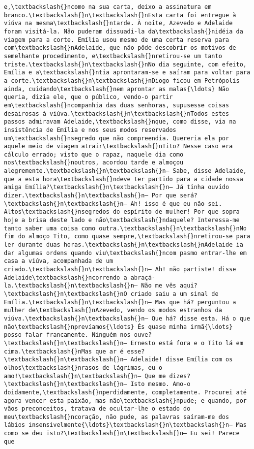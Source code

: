 \begin{Verbatim}[commandchars=\\\{\}]
e,\textbackslash{}ncomo na sua carta, deixo a assinatura em branco.\textbackslash{}n\textbackslash{}nEsta carta foi entregue à viúva na mesma\textbackslash{}ntarde. À noite, Azevedo e Adelaide foram visitá-la. Não puderam dissuadi-la da\textbackslash{}nidéia da viagem para a corte. Emília usou mesmo de uma certa reserva para com\textbackslash{}nAdelaide, que não pôde descobrir os motivos de semelhante procedimento, e\textbackslash{}nretirou-se um tanto triste.\textbackslash{}n\textbackslash{}nNo dia seguinte, com efeito, Emília e a\textbackslash{}ntia aprontaram-se e saíram para voltar para a corte.\textbackslash{}n\textbackslash{}nDiogo ficou em Petrópolis ainda, cuidando\textbackslash{}nem aprontar as malas{\ldots} Não queria, dizia ele, que o público, vendo-o partir em\textbackslash{}ncompanhia das duas senhoras, supusesse coisas desairosas à viúva.\textbackslash{}n\textbackslash{}nTodos estes passos admiravam Adelaide,\textbackslash{}nque, como disse, via na insistência de Emília e nos seus modos reservados um\textbackslash{}nsegredo que não compreendia. Quereria ela por aquele meio de viagem atrair\textbackslash{}nTito? Nesse caso era cálculo errado; visto que o rapaz, naquele dia como nos\textbackslash{}noutros, acordou tarde e almoçou alegremente.\textbackslash{}n\textbackslash{}n— Sabe, disse Adelaide, que a esta hora\textbackslash{}ndeve ter partido para a cidade nossa amiga Emília?\textbackslash{}n\textbackslash{}n— Já tinha ouvido dizer.\textbackslash{}n\textbackslash{}n— Por que será?\textbackslash{}n\textbackslash{}n— Ah! isso é que eu não sei. Altos\textbackslash{}nsegredos do espírito de mulher! Por que sopra hoje a brisa deste lado e não\textbackslash{}ndaquele? Interessa-me tanto saber uma coisa como outra.\textbackslash{}n\textbackslash{}nNo fim do almoço Tito, como quase sempre,\textbackslash{}nretirou-se para ler durante duas horas.\textbackslash{}n\textbackslash{}nAdelaide ia dar algumas ordens quando viu\textbackslash{}ncom pasmo entrar-lhe em casa a viúva, acompanhada de um criado.\textbackslash{}n\textbackslash{}n— Ah! não partiste! disse Adelaide\textbackslash{}ncorrendo a abraçá-la.\textbackslash{}n\textbackslash{}n— Não me vês aqui?\textbackslash{}n\textbackslash{}nO criado saiu a um sinal de Emília.\textbackslash{}n\textbackslash{}n— Mas que há? perguntou a mulher de\textbackslash{}nAzevedo, vendo os modos estranhos da viúva.\textbackslash{}n\textbackslash{}n— Que há? disse esta. Há o que não\textbackslash{}nprevíamos{\ldots} És quase minha irmã{\ldots} posso falar francamente. Ninguém nos ouve?\textbackslash{}n\textbackslash{}n— Ernesto está fora e o Tito lá em cima.\textbackslash{}nMas que ar é esse?\textbackslash{}n\textbackslash{}n— Adelaide! disse Emília com os olhos\textbackslash{}nrasos de lágrimas, eu o amo!\textbackslash{}n\textbackslash{}n— Que me dizes?\textbackslash{}n\textbackslash{}n— Isto mesmo. Amo-o doidamente,\textbackslash{}nperdidamente, completamente. Procurei até agora vencer esta paixão, mas não\textbackslash{}npude; e quando, por vãos preconceitos, tratava de ocultar-lhe o estado do meu\textbackslash{}ncoração, não pude, as palavras saíram-me dos lábios insensivelmente{\ldots}\textbackslash{}n\textbackslash{}n— Mas como se deu isto?\textbackslash{}n\textbackslash{}n— Eu sei! Parece que 
\end{Verbatim}
